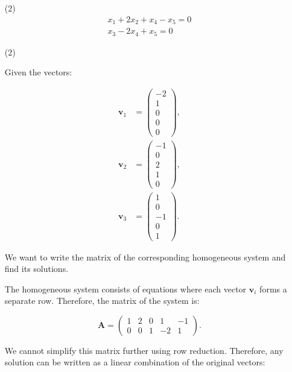 \documentclass{report}
\begin{document}
\begin{enumerate}
    \item[(2)]
\begin{eqnarray*}
x_1+2x_2+x_4-x_5 = 0\\
x_3-2x_4+x_5 = 0
\end{eqnarray*}
\end{enumerate}


\sol

\begin{enumerate}
\item[(2)]








Given the vectors:

\begin{align*}
\mathbf{v}_1 &= \begin{pmatrix} -2 \\ 1 \\ 0 \\ 0 \\ 0 \end{pmatrix}, \\
\mathbf{v}_2 &= \begin{pmatrix} -1 \\ 0 \\ 2 \\ 1 \\ 0 \end{pmatrix}, \\
\mathbf{v}_3 &= \begin{pmatrix} 1 \\ 0 \\ -1 \\ 0 \\ 1 \end{pmatrix}.
\end{align*}

We want to write the matrix of the corresponding homogeneous system and find its solutions.


The homogeneous system consists of equations where each vector $\mathbf{v}_i$ forms a separate row. Therefore, the matrix of the system is:

\[
\mathbf{A} = \begin{pmatrix}
1 & 2 & 0 & 1 & -1 \\
0 & 0 & 1 & -2 & 1
\end{pmatrix}.
\]


We cannot simplify this matrix further using row reduction. Therefore, any solution can be written as a linear combination of the original vectors:


\end{enumerate}
\end{document}
